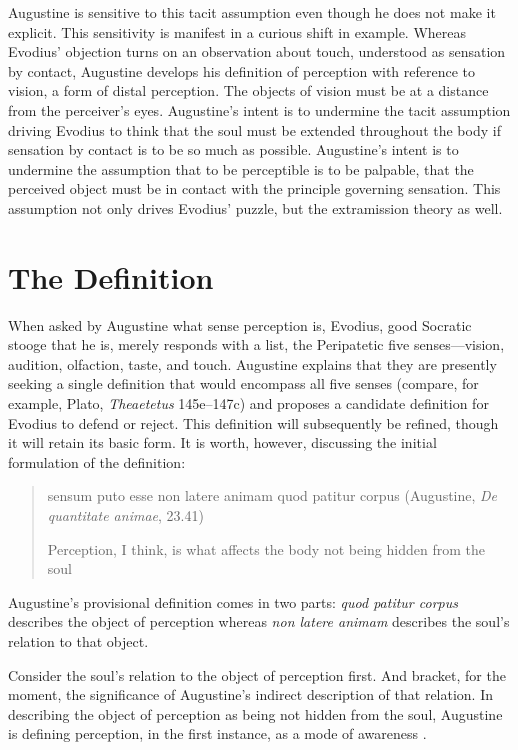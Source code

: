 \documentclass[12pt]{article}
\begin{document}
Augustine is sensitive to this tacit assumption even though he does not make it explicit. This sensitivity is manifest in a curious shift in example. Whereas Evodius' objection turns on an observation about touch, understood as sensation by contact, Augustine develops his definition of perception with reference to vision, a form of distal perception. The objects of vision must be at a distance from the perceiver's eyes. Augustine's intent is to undermine the tacit assumption driving Evodius to think that the soul must be extended throughout the body if sensation by contact is to be so much as possible. Augustine's intent is to undermine the assumption that to be perceptible is to be palpable, that the perceived object must be in contact with the principle governing sensation. This assumption not only drives Evodius' puzzle, but the extramission theory as well. 


\section{The Definition} %
\label{sec:the_definition}

When asked by Augustine what sense perception is, Evodius, good Socratic stooge that he is, merely responds with a list, the Peripatetic five senses---vision, audition, olfaction, taste, and touch. Augustine explains that they are presently seeking a single definition that would encompass all five senses (compare, for example, Plato, \emph{Theaetetus} 145e--147c) and proposes a candidate definition for Evodius to defend or reject. This definition will subsequently be refined, though it will retain its basic form. It is worth, however, discussing the initial formulation of the definition:
\begin{quote}
	sensum puto esse non latere animam quod patitur corpus (Augustine, \emph{De quantitate animae}, 23.41)
	
	Perception, I think, is what affects the body not being hidden from the soul
\end{quote}
Augustine's provisional definition comes in two parts: \emph{quod patitur corpus} describes the object of perception whereas \emph{non latere animam} describes the soul's relation to that object. 

Consider the soul's relation to the object of perception first. And bracket, for the moment, the significance of Augustine's indirect description of that relation. In describing the object of perception as being not hidden from the soul, Augustine is defining perception, in the first instance, as a mode of awareness \citep[275]{Brittain:2002hl}. 
\end{document}
